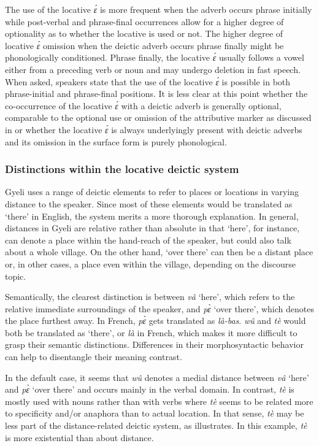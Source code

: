 The use of the locative {\itshape ɛ́} is more frequent when the adverb occurs phrase initially while post-verbal and  phrase-final occurrences allow for a higher degree of optionality as to whether the locative is used or not. 
The higher degree of locative {\itshape ɛ́} omission when the deictic adverb occurs phrase finally might be phonologically conditioned. Phrase finally, the locative {\itshape ɛ́} usually follows a vowel either from a preceding verb or noun and may undergo deletion in fast speech. When asked, speakers state that the use of the locative {\itshape ɛ́} is possible in both phrase-initial and phrase-final positions. It is less clear at this point whether the co-occurrence of the locative {\itshape ɛ́} with a deictic adverb is generally optional, comparable to the optional use or omission of the attributive marker as discussed in  or whether the locative {\itshape ɛ́} is always underlyingly present with deictic adverbs and its omission in the surface form is purely phonological. 

\subsubsection*{Distinctions within the locative deictic system}
Gyeli uses a range of deictic elements to refer to places or locations in varying distance to the speaker. Since most of these elements would be translated as `there' in English, the system merits a more thorough explanation. In general, distances in Gyeli are relative rather than absolute in that `here', for instance,  can denote a place within the hand-reach of the speaker, but could also talk about a whole village. On the other hand, `over there' can then be a distant place or, in other cases,  a place even within  the village, depending on the discourse topic. 

Semantically, the clearest distinction is between {\itshape vâ} `here', which refers to the relative immediate surroundings of the speaker, and {\itshape pɛ̀} `over there', which denotes the place furthest away. In French, {\itshape pɛ̀} gets translated as {\itshape là-bas}. {\itshape wû} and {\itshape tè} would both be translated as `there', or {\itshape là} in French, which makes it more difficult to grasp their semantic distinctions. Differences in their morphosyntactic behavior can help to disentangle their meaning contrast.

In the default case, it seems that {\itshape wû} denotes a medial distance between {\itshape vâ} `here' and {\itshape pɛ̀} `over there' and occurs mainly in the verbal domain. In contrast, {\itshape tè} is mostly used with nouns rather than with verbs where {\itshape tè} seems to be related more to specificity and/or anaphora than to actual location. In that sense, {\itshape tè} may be less part of the distance-related deictic system, as  illustrates. In this example, {\itshape tè} is more existential than about distance.



